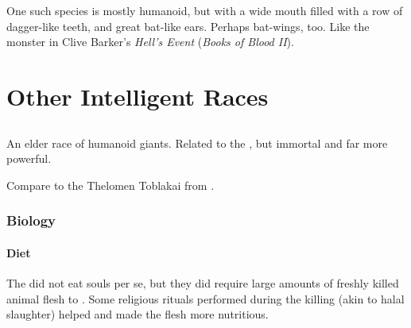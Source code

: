 One such species is mostly humanoid, but with a wide mouth filled with a row of dagger-like teeth, and great bat-like ears. Perhaps bat-wings, too. Like the monster in Clive Barker's \emph{Hell's Event} (\emph{Books of Blood II}).























\chapter{Other Intelligent Races}















\section{\Aryoth}
\index{\aryoth}
An elder race of humanoid giants. 
Related to the \nephilim, but immortal and far more powerful. 


Compare to the Thelomen Toblakai from \cite{StevenEriksonIanCameronEsslemont:MalazanBookoftheFallen}. 









\subsection{Biology}





\subsubsection{Diet}
The \aryothim did not eat souls per se, but they did require large amounts of freshly killed animal flesh to . 
Some religious rituals performed during the killing (akin to halal slaughter) helped and made the flesh more nutritious.

